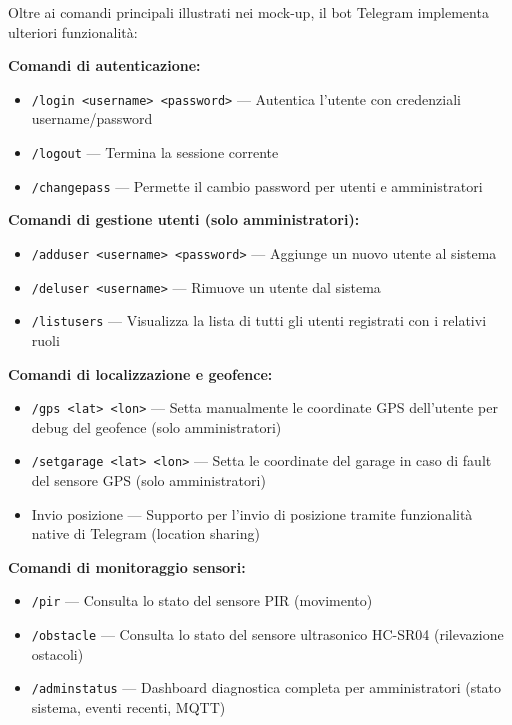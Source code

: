 Oltre ai comandi principali illustrati nei mock-up, il bot Telegram implementa ulteriori funzionalità:

\textbf{Comandi di autenticazione:}
\begin{itemize}
    \item \texttt{/login <username> <password>} --- Autentica l'utente con credenziali username/password
    \item \texttt{/logout} --- Termina la sessione corrente
    \item \texttt{/changepass} --- Permette il cambio password per utenti e amministratori
\end{itemize}

\textbf{Comandi di gestione utenti (solo amministratori):}
\begin{itemize}
    \item \texttt{/adduser <username> <password>} --- Aggiunge un nuovo utente al sistema
    \item \texttt{/deluser <username>} --- Rimuove un utente dal sistema
    \item \texttt{/listusers} --- Visualizza la lista di tutti gli utenti registrati con i relativi ruoli
\end{itemize}

\textbf{Comandi di localizzazione e geofence:}
\begin{itemize}
    \item \texttt{/gps <lat> <lon>} --- Setta manualmente le coordinate GPS dell'utente per debug del geofence (solo amministratori)
    \item \texttt{/setgarage <lat> <lon>} --- Setta le coordinate del garage in caso di fault del sensore GPS (solo amministratori)
    \item Invio posizione --- Supporto per l'invio di posizione tramite funzionalità native di Telegram (location sharing)
\end{itemize}

\textbf{Comandi di monitoraggio sensori:}
\begin{itemize}
    \item \texttt{/pir} --- Consulta lo stato del sensore PIR (movimento)
    \item \texttt{/obstacle} --- Consulta lo stato del sensore ultrasonico HC-SR04 (rilevazione ostacoli)
    \item \texttt{/adminstatus} --- Dashboard diagnostica completa per amministratori (stato sistema, eventi recenti, MQTT)
\end{itemize}

